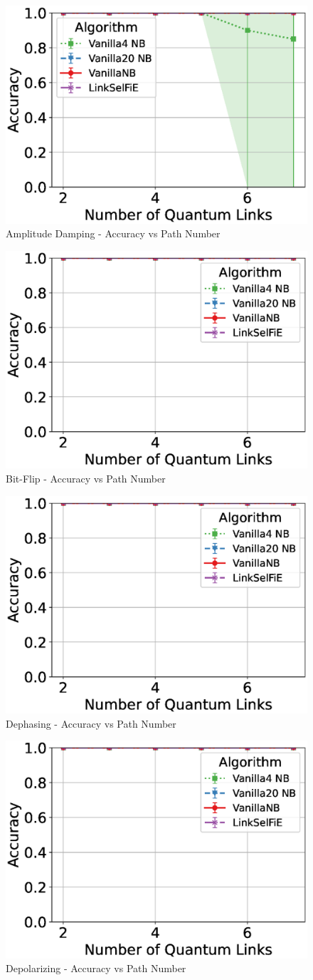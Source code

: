 \documentclass[conference]{IEEEtran}
\begin{document}
\begin{figure}[t]
\centering
\includegraphics[width=0.45\columnwidth]{figure/plot_accuracy_vs_path_num_AmplitudeDamping.eps}
\caption{Amplitude Damping - Accuracy vs Path Number}
\label{fig:acc_amplitude}
\end{figure}

\begin{figure}[t]
\centering
\includegraphics[width=0.45\columnwidth]{figure/plot_accuracy_vs_path_num_BitFlip.eps}
\caption{Bit-Flip - Accuracy vs Path Number}
\label{fig:acc_bitflip}
\end{figure}

\begin{figure}[t]
\centering
\includegraphics[width=0.45\columnwidth]{figure/plot_accuracy_vs_path_num_Dephase.eps}
\caption{Dephasing - Accuracy vs Path Number}
\label{fig:acc_dephase}
\end{figure}

\begin{figure}[t]
\centering
\includegraphics[width=0.45\columnwidth]{figure/plot_accuracy_vs_path_num_Depolar.eps}
\caption{Depolarizing - Accuracy vs Path Number}
\label{fig:acc_depolar}
\end{figure}
\end{document}
